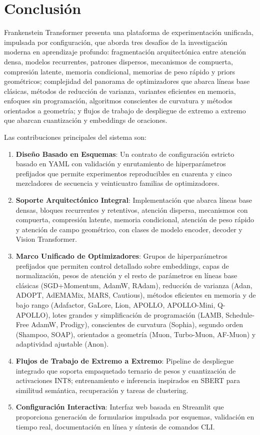 \section{Conclusión}
\label{sec:conclusion}

Frankenstein Transformer presenta una plataforma de experimentación unificada, impulsada por configuración, que aborda tres desafíos de la investigación moderna en aprendizaje profundo: fragmentación arquitectónica entre atención densa, modelos recurrentes, patrones dispersos, mecanismos de compuerta, compresión latente, memoria condicional, memorias de peso rápido y priors geométricos; complejidad del panorama de optimizadores que abarca líneas base clásicas, métodos de reducción de varianza, variantes eficientes en memoria, enfoques sin programación, algoritmos conscientes de curvatura y métodos orientados a geometría; y flujos de trabajo de despliegue de extremo a extremo que abarcan cuantización y embeddings de oraciones.

Las contribuciones principales del sistema son:
\begin{enumerate}[leftmargin=*]
    \item \textbf{Diseño Basado en Esquemas}: Un contrato de configuración estricto basado en YAML con validación y enrutamiento de hiperparámetros prefijados que permite experimentos reproducibles en cuarenta y cinco mezcladores de secuencia y veinticuatro familias de optimizadores.
    \item \textbf{Soporte Arquitectónico Integral}: Implementación que abarca líneas base densas, bloques recurrentes y retentivos, atención dispersa, mecanismos con compuerta, compresión latente, memoria condicional, atención de peso rápido y atención de campo geométrico, con clases de modelo encoder, decoder y Vision Transformer.
    \item \textbf{Marco Unificado de Optimizadores}: Grupos de hiperparámetros prefijados que permiten control detallado sobre embeddings, capas de normalización, pesos de atención y el resto de parámetros en líneas base clásicas (SGD+Momentum, AdamW, RAdam), reducción de varianza (Adan, ADOPT, AdEMAMix, MARS, Cautious), métodos eficientes en memoria y de bajo rango (Adafactor, GaLore, Lion, APOLLO, APOLLO-Mini, Q-APOLLO), lotes grandes y simplificación de programación (LAMB, Schedule-Free AdamW, Prodigy), conscientes de curvatura (Sophia), segundo orden (Shampoo, SOAP), orientados a geometría (Muon, Turbo-Muon, AF-Muon) y adaptividad ajustable (Anon).
    \item \textbf{Flujos de Trabajo de Extremo a Extremo}: Pipeline de despliegue integrado que soporta empaquetado ternario de pesos y cuantización de activaciones INT8; entrenamiento e inferencia inspirados en SBERT para similitud semántica, recuperación y tareas de clustering.
    \item \textbf{Configuración Interactiva}: Interfaz web basada en Streamlit que proporciona generación de formularios impulsada por esquemas, validación en tiempo real, documentación en línea y síntesis de comandos CLI.
\end{enumerate}

